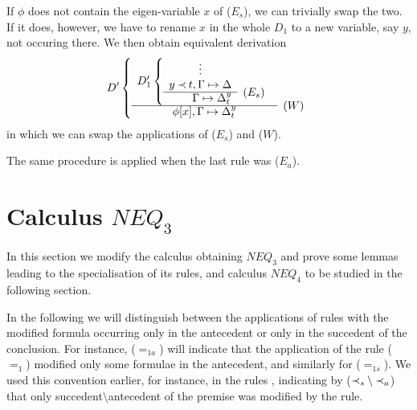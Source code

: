 \begin{PROOF}
\begin{LS}
If $\phi$ does not contain the eigen-variable $x$ of ($E_s$), we can
trivially swap the two. If it does, however, we have to rename $x$ in the
whole $D_1$ to a new variable, say $y$, not occuring there. We then obtain
equivalent derivation 
\[ D' \left \{ \begin{array}{cl}
 D_1' \left \{ \begin{array}{rl}
 \multicolumn{1}{c}{\vdots} \\
 y\Incl t,  \GSD \\ \cline{1-1}
  \GSD_t^y & \rabove{(E_s)} \end{array} \right . \\ \cline{1-1}
 \phi[x], \GSD_t^y & \rabove{(W)} \end{array} \right . \]
in which we can swap the applications of ($E_s$) and ($W$). \\
\item The same procedure is applied when the last rule was ($E_a$).
\end{LS}
\end{PROOF}

\section{Calculus $NEQ_3$}
In this section we modify the calculus obtaining $NEQ_3$ and prove
some lemmas leading to the specialisation of its rules, and calculus $NEQ_4$
to be studied in the following section.

In the following we will distinguish between the applications of rules with 
the modified formula occurring only in the antecedent or only in the succedent
of the conclusion. For instance, ($=_{1a}$) will indicate that the application
of the rule ($=_1$) modified only some formulae in the antecedent, and similarly
for ($=_{1s}$). We used this convention earlier, for instance, 
in the rules , 
indicating by ($\mathbin{\prec}_s\setminus \mathbin{\prec}_a$) that only succedent$\setminus$antecedent
 of the premise was modified by the rule.

